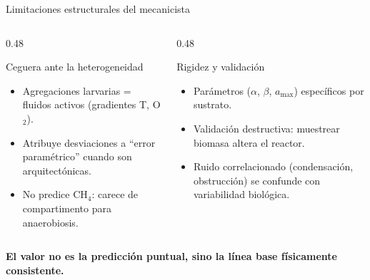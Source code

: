 \documentclass[aspectratio=169, 11pt]{beamer}
\begin{document}
\begin{frame}{Limitaciones estructurales del mecanicista}
    \begin{columns}[T]
        \begin{column}{0.48\textwidth}
            \begin{alertblock}{Ceguera ante la heterogeneidad}
                \begin{itemize}
                    \item Agregaciones larvarias = fluidos activos (gradientes T, O$_2$).
                    \item Atribuye desviaciones a ``error param\'{e}trico'' cuando son arquitect\'{o}nicas.
                    \item No predice CH$_4$: carece de compartimento para anaerobiosis.
                \end{itemize}
            \end{alertblock}
        \end{column}
        \begin{column}{0.48\textwidth}
            \begin{alertblock}{Rigidez y validaci\'{o}n}
                \begin{itemize}
                    \item Par\'{a}metros ($\alpha$, $\beta$, $a_{\text{max}}$) espec\'{i}ficos por sustrato.
                    \item Validaci\'{o}n destructiva: muestrear biomasa altera el reactor.
                    \item Ruido correlacionado (condensaci\'{o}n, obstrucci\'{o}n) se confunde con variabilidad biol\'{o}gica.
                \end{itemize}
            \end{alertblock}
        \end{column}
    \end{columns}

    \vfill
    \begin{center}
        \textbf{El valor no es la predicci\'{o}n puntual, sino la l\'{i}nea base f\'{i}sicamente consistente.}
    \end{center}
\end{frame}
\end{document}
